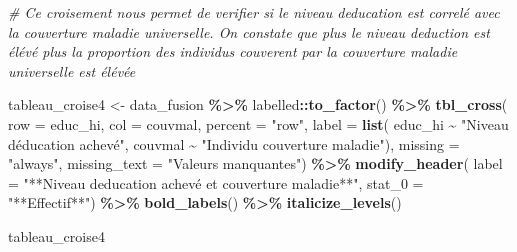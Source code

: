\documentclass[
]{article}
\newenvironment{Shaded}{\begin{snugshade}}{\end{snugshade}}
\newcommand{\AttributeTok}[1]{\textcolor[rgb]{0.13,0.29,0.53}{#1}}
\newcommand{\CommentTok}[1]{\textcolor[rgb]{0.56,0.35,0.01}{\textit{#1}}}
\newcommand{\FunctionTok}[1]{\textcolor[rgb]{0.13,0.29,0.53}{\textbf{#1}}}
\newcommand{\NormalTok}[1]{#1}
\newcommand{\OtherTok}[1]{\textcolor[rgb]{0.56,0.35,0.01}{#1}}
\newcommand{\SpecialCharTok}[1]{\textcolor[rgb]{0.81,0.36,0.00}{\textbf{#1}}}
\newcommand{\StringTok}[1]{\textcolor[rgb]{0.31,0.60,0.02}{#1}}
\begin{document}
\begin{Shaded}
\begin{Highlighting}[]
\CommentTok{\# Ce croisement nous permet de verifier si le niveau d\textquotesingle{}education est correlé avec la couverture maladie universelle. On constate que plus le niveau d\textquotesingle{}eduction est élévé plus la proportion des individus couverent par la couverture maladie universelle est élévée}

\NormalTok{tableau\_croise4 }\OtherTok{\textless{}{-}}\NormalTok{ data\_fusion }\SpecialCharTok{\%\textgreater{}\%}
\NormalTok{  labelled}\SpecialCharTok{::}\FunctionTok{to\_factor}\NormalTok{() }\SpecialCharTok{\%\textgreater{}\%}  
  \FunctionTok{tbl\_cross}\NormalTok{(}
    \AttributeTok{row =}\NormalTok{ educ\_hi,  }
    \AttributeTok{col =}\NormalTok{ couvmal,  }
    \AttributeTok{percent =} \StringTok{"row"}\NormalTok{,  }
    \AttributeTok{label =} \FunctionTok{list}\NormalTok{(}
\NormalTok{      educ\_hi }\SpecialCharTok{\textasciitilde{}} \StringTok{"Niveau d\textquotesingle{}éducation achevé"}\NormalTok{,  }
\NormalTok{      couvmal }\SpecialCharTok{\textasciitilde{}} \StringTok{"Individu couverture maladie"}\NormalTok{),}
    \AttributeTok{missing =} \StringTok{"always"}\NormalTok{,  }
    \AttributeTok{missing\_text =} \StringTok{"Valeurs manquantes"}\NormalTok{) }\SpecialCharTok{\%\textgreater{}\%}
  \FunctionTok{modify\_header}\NormalTok{(}
    \AttributeTok{label =} \StringTok{"**Niveau d\textquotesingle{}education achevé et couverture maladie**"}\NormalTok{,}
    \AttributeTok{stat\_0 =} \StringTok{"**Effectif**"}\NormalTok{) }\SpecialCharTok{\%\textgreater{}\%}
  \FunctionTok{bold\_labels}\NormalTok{() }\SpecialCharTok{\%\textgreater{}\%}  
  \FunctionTok{italicize\_levels}\NormalTok{()}

\NormalTok{tableau\_croise4}
\end{Highlighting}
\end{Shaded}
\end{document}
